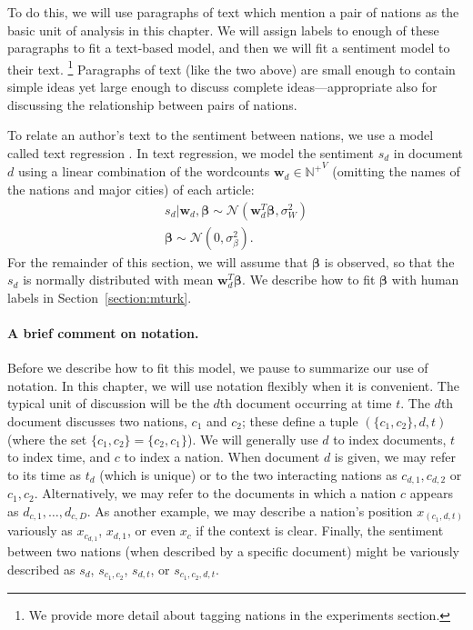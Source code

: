 To do this, we will use paragraphs of text which mention a pair of
nations as the basic unit of analysis in this chapter.  We will assign
labels to enough of these paragraphs to fit a text-based model, and
then we will fit a sentiment model to their text. \footnote{We provide
  more detail about tagging nations in the experiments section.}
Paragraphs of text (like the two above) are small enough to contain
simple ideas yet large enough to discuss complete ideas---appropriate
also for discussing the relationship between pairs of nations.

To relate an author's text to the sentiment between nations, we use a
model called text regression \citep{kogan:2009}.  In text regression,
we model the sentiment $s_d$ in document $d$ using a linear
combination of the wordcounts $\bm w_d \in \mathbb{N^+}^V$ (omitting
the names of the nations and major cities) of each article:
\begin{align}
  s_d | \bm w_d, \bm \beta \sim \mathcal{N}( \bm w_d^T \bm \beta,
  \sigma_W^2 ) \nonumber \\
  \bm \beta \sim \mathcal{N}(0, \sigma_\beta^2 ).
  \label{eq:sentiment_text}
\end{align}
For the remainder of this section, we will assume that $\bm \beta$ is
observed, so that the $s_d$ is normally distributed with mean $\bm
w_d^T \bm \beta$.  We describe how to fit $\bm \beta$ with human
labels in Section~\ref{section:mturk}.

\paragraph{A brief comment on notation.} Before we describe how to fit
this model, we pause to summarize our use of notation.  In this
chapter, we will use notation flexibly when it is convenient.  The
typical unit of discussion will be the $d$th document occurring at
time $t$.  The $d$th document discusses two nations, $c_1$ and $c_2$;
these define a tuple $(\{ c_1, c_2 \}, d, t)$ (where the set $\{ c_1,
c_2 \} = \{ c_2, c_1 \}$).  We will generally use $d$ to index
documents, $t$ to index time, and $c$ to index a nation.  When
document $d$ is given, we may refer to its time as $t_d$ (which is
unique) or to the two interacting nations as $c_{d,1},c_{d,2}$ or
$c_1,c_2$.  Alternatively, we may refer to the documents in which a
nation $c$ appears as $d_{c,1}, \ldots, d_{c,D}$.  As another example,
we may describe a nation's position $x_{(c_1,d,t)}$ variously as
$x_{c_{d,1}}$, $x_{d,1}$, or even $x_c$ if the context is
clear. Finally, the sentiment between two nations (when described by a
specific document) might be variously described as $s_d$,
$s_{c_1,c_2}$, $s_{d,t}$, or $s_{c_1,c_2,d,t}$.

